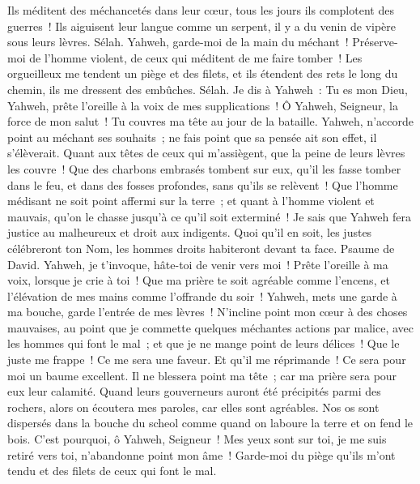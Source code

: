 \begin{multicols}{2}
Ils méditent des méchancetés dans leur cœur, tous les jours ils complotent des guerres~!
Ils aiguisent leur langue comme un serpent, il y a du venin de vipère sous leurs lèvres. Sélah.
Yahweh, garde-moi de la main du méchant~! Préserve-moi de l'homme violent, de ceux qui méditent de me faire tomber~!
Les orgueilleux me tendent un piège et des filets, et ils étendent des rets le long du chemin, ils me dressent des embûches. Sélah.
Je dis à Yahweh~: Tu es mon Dieu, Yahweh, prête l'oreille à la voix de mes supplications~!
Ô Yahweh, Seigneur, la force de mon salut~! Tu couvres ma tête au jour de la bataille.
Yahweh, n'accorde point au méchant ses souhaits~; ne fais point que sa pensée ait son effet, il s'élèverait.  
Quant aux têtes de ceux qui m'assiègent, que la peine de leurs lèvres les couvre~!
Que des charbons embrasés tombent sur eux, qu'il les fasse tomber dans le feu, et dans des fosses profondes, sans qu'ils se relèvent~!
Que l'homme médisant ne soit point affermi sur la terre~; et quant à l'homme violent et mauvais, qu'on le chasse jusqu'à ce qu'il soit exterminé~!
Je sais que Yahweh fera justice au malheureux et droit aux indigents.
Quoi qu'il en soit, les justes célébreront ton Nom, les hommes droits habiteront devant ta face.
\VerseOne{}Psaume de David. Yahweh, je t'invoque, hâte-toi de venir vers moi~! Prête l'oreille à ma voix, lorsque je crie à toi~!
Que ma prière te soit agréable comme l'encens, et l'élévation de mes mains comme l'offrande du soir~!
Yahweh, mets une garde à ma bouche, garde l'entrée de mes lèvres~!
N'incline point mon cœur à des choses mauvaises, au point que je commette quelques méchantes actions par malice, avec les hommes qui font le mal~; et que je ne mange point de leurs délices~!
Que le juste me frappe~! Ce me sera une faveur. Et qu'il me réprimande~! Ce sera pour moi un baume excellent. Il ne blessera point ma tête~; car ma prière sera pour eux leur calamité.
Quand leurs gouverneurs auront été précipités parmi des rochers, alors on écoutera mes paroles, car elles sont agréables.
Nos os sont dispersés dans la bouche du scheol comme quand on laboure la terre et on fend le bois.
C'est pourquoi, ô Yahweh, Seigneur~! Mes yeux sont sur toi, je me suis retiré vers toi, n'abandonne point mon âme~!
Garde-moi du piège qu'ils m'ont tendu et des filets de ceux qui font le mal.

\end{multicols}
